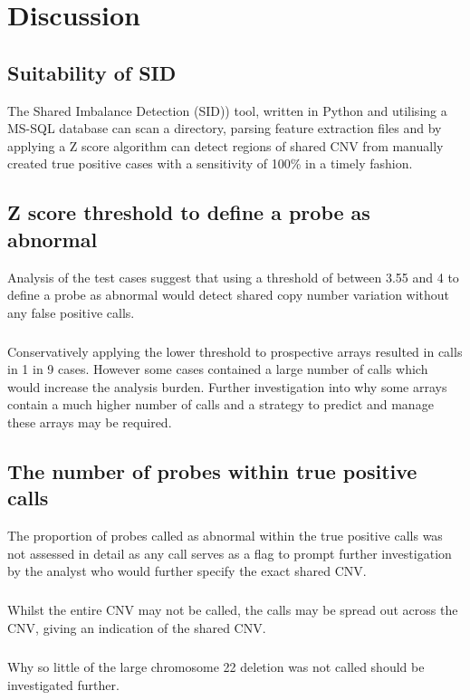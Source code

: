 \chapter{Discussion}\label{ch:Discussion} 
\section{Suitability of SID}
The Shared Imbalance Detection (SID)) tool, written in Python and utilising a MS-SQL database can scan a directory, parsing feature extraction files and by applying a Z score algorithm can detect regions of shared CNV from manually created true positive cases with a sensitivity of 100\% in a timely fashion.


\section{Z score threshold to define a probe as abnormal}
Analysis of the test cases suggest that using a threshold of between 3.55 and 4 to define a probe as abnormal would detect shared copy number variation without any false positive calls. 

\paragraph*{}
Conservatively applying the lower threshold to prospective arrays resulted in calls in 1 in 9 cases. However some cases contained a large number of calls which would increase the analysis burden. Further investigation into why some arrays contain a much higher number of calls and a strategy to predict and manage these arrays may be required.

\section{The number of probes within true positive calls}
The proportion of probes called as abnormal within the true positive calls was not assessed in detail as any call serves as a flag to prompt further investigation by the analyst who would further specify the exact shared CNV.
\paragraph*{}
Whilst the entire CNV may not be called, the calls may be spread out across the CNV, giving an indication of the shared CNV.
\paragraph*{}
Why so little of the large chromosome 22 deletion was not called should be investigated further.

